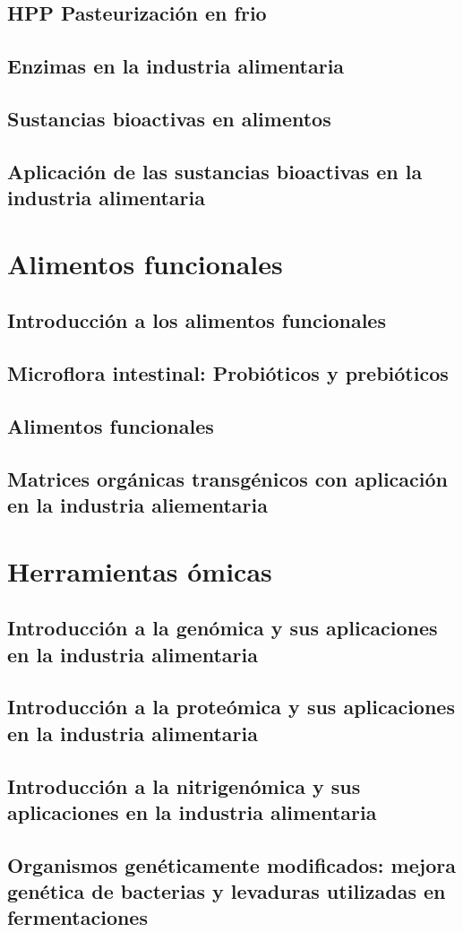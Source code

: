 \documentclass{../Resume}
\begin{document}
    \chapter{HPP Pasteurización en frio}
    \chapter{Enzimas en la industria alimentaria}
    \chapter{Sustancias bioactivas en alimentos}
    \chapter{Aplicación de las sustancias bioactivas en la industria alimentaria}

\part{Alimentos funcionales}

    \chapter{Introducción a los alimentos funcionales}
    \chapter{Microflora intestinal: Probióticos y prebióticos}
    \chapter{Alimentos funcionales}
    \chapter{Matrices orgánicas transgénicos con aplicación en la industria aliementaria}

\part{Herramientas ómicas}

    \chapter{Introducción a la genómica y sus aplicaciones en la industria alimentaria}
    \chapter{Introducción a la proteómica y sus aplicaciones en la industria alimentaria}
    \chapter{Introducción a la nitrigenómica y sus aplicaciones en la industria alimentaria}
    \chapter{Organismos genéticamente modificados: mejora genética de bacterias y levaduras utilizadas en fermentaciones}


\newpage


\end{document}
